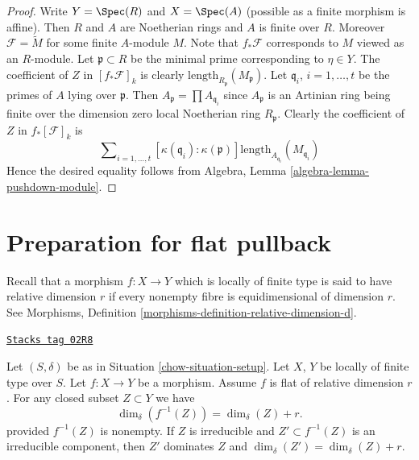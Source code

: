 \begin{proof}
\medskip\noindent
Write $Y = \Spec(R)$ and $X = \Spec(A)$ (possible as
a finite morphism is affine).
Then $R$ and $A$ are Noetherian rings and $A$ is finite over $R$.
Moreover $\mathcal{F} = \widetilde{M}$ for some finite $A$-module
$M$. Note that $f_*\mathcal{F}$ corresponds to $M$ viewed as an $R$-module.
Let $\mathfrak p \subset R$ be the minimal prime corresponding
to $\eta \in Y$. The coefficient of $Z$ in $[f_*\mathcal{F}]_k$
is clearly $\text{length}_{R_{\mathfrak p}}(M_{\mathfrak p})$.
Let $\mathfrak q_i$, $i = 1, \ldots, t$ be the primes of $A$
lying over $\mathfrak p$. Then $A_{\mathfrak p} = \prod A_{\mathfrak q_i}$
since $A_{\mathfrak p}$ is an Artinian ring being finite over the
dimension zero local Noetherian ring $R_{\mathfrak p}$.
Clearly the coefficient of $Z$ in $f_*[\mathcal{F}]_k$ is
$$
\sum\nolimits_{i = 1, \ldots, t}
[\kappa(\mathfrak q_i) : \kappa(\mathfrak p)]
\text{length}_{A_{\mathfrak q_i}}(M_{\mathfrak q_i})
$$
Hence the desired equality follows from
Algebra, Lemma \ref{algebra-lemma-pushdown-module}.
\end{proof}

\section{Preparation for flat pullback}
\label{chow-section-preparation-flat-pullback}
Recall that a morphism $f : X \to Y$ which is locally of finite type
is said to have relative dimension $r$ if every nonempty fibre
is equidimensional of dimension $r$. See
Morphisms, Definition \ref{morphisms-definition-relative-dimension-d}.

\begin{lemma}
\label{chow-lemma-flat-inverse-image-dimension}
\href{https://stacks.math.columbia.edu/tag/02R8}{\texttt{Stacks tag 02R8}}

Let $(S, \delta)$ be as in Situation \ref{chow-situation-setup}.
Let $X$, $Y$ be locally of finite type over $S$.
Let $f : X \to Y$ be a morphism.
Assume $f$ is flat of relative dimension $r$.
For any closed subset $Z \subset Y$ we have
$$
\dim_\delta(f^{-1}(Z)) = \dim_\delta(Z) + r.
$$
provided $f^{-1}(Z)$ is nonempty.
If $Z$ is irreducible and $Z' \subset f^{-1}(Z)$ is an irreducible
component, then $Z'$ dominates $Z$ and
$\dim_\delta(Z') = \dim_\delta(Z) + r$.
\end{lemma}

